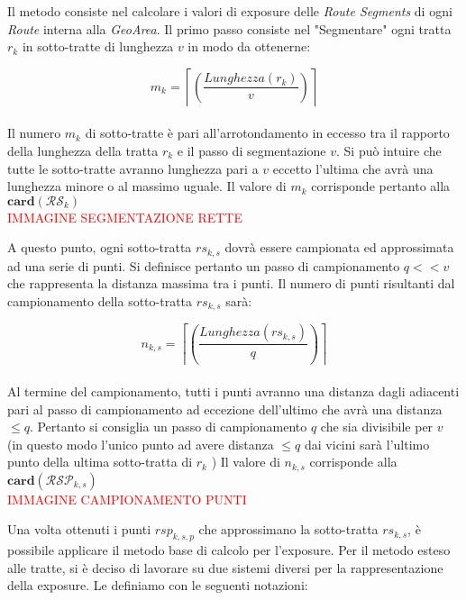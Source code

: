 \noindent Il metodo consiste nel calcolare i valori di exposure delle \textit{Route Segments} di ogni \textit{Route} interna alla \textit{GeoArea}.
Il primo passo consiste nel "Segmentare" ogni tratta $r_k$ in sotto-tratte di lunghezza $v$ in modo da ottenerne:

\begin{equation}\label{eq:numerotratte}
m_{k}=\left\lceil\left(\frac{Lunghezza(r_k)}{v}\right)\right\rceil
\end{equation}
\\
Il numero $m_{k}$ di sotto-tratte è pari all'arrotondamento in eccesso tra il rapporto della lunghezza della tratta $r_k$ e il passo di segmentazione $v$. Si può intuire che tutte le sotto-tratte avranno lunghezza pari a $v$ eccetto l'ultima che avrà una lunghezza minore o al massimo uguale. Il valore di $m_k$ corrisponde pertanto alla $\mathbf{card}(\mathcal{RS}_{k})$
\\

\textcolor{red}{IMMAGINE SEGMENTAZIONE RETTE}


\noindent A questo punto, ogni sotto-tratta $rs_{k,s}$ dovrà essere campionata ed approssimata ad una serie di punti. Si definisce pertanto un passo di campionamento $q << v$ che rappresenta la distanza massima tra i punti. Il numero di punti risultanti dal campionamento della sotto-tratta $rs_{k,s}$ sarà:

\begin{equation}\label{eq:numerotratte}
n_{k,s}=\left\lceil\left(\frac{Lunghezza(rs_{k,s})}{q}\right)\right\rceil
\end{equation}
\\
Al termine del campionamento, tutti i punti avranno una distanza dagli adiacenti pari al passo di campionamento ad eccezione dell'ultimo che avrà una distanza $\le q$. Pertanto si consiglia un passo di campionamento $q$ che sia divisibile per $v$ (in questo modo l'unico punto ad avere distanza $\le q$ dai vicini sarà l'ultimo punto della ultima sotto-tratta di $r_k$ ) Il valore di $n_{k,s}$ corrisponde alla $\mathbf{card}(\mathcal{RSP}_{k,s})$
\\
\textcolor{red}{IMMAGINE CAMPIONAMENTO PUNTI }

Una volta ottenuti i punti $rsp_{k,s,p}$ che approssimano la sotto-tratta $rs_{k,s}$, è possibile applicare il metodo base di calcolo per l'exposure. Per il metodo esteso alle tratte, si è deciso di lavorare su due sistemi diversi per la rappresentazione della exposure. Le definiamo con le seguenti notazioni:

